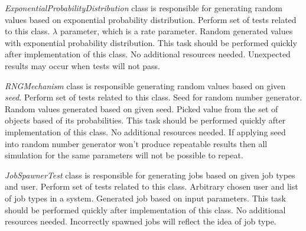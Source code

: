 	{
		{
			\emph{ExponentialProbabilityDistribution} class is responsible for generating random values based on exponential probability distribution.
		}
		{
			Perform set of tests related to this class. 
		}
		{
			$\lambda$ parameter, which is a rate parameter.   
		}
		{
			Random generated values with exponential probability distribution.
		}
		{
			This task should be performed quickly after implementation of this class.
		}
		{
			No additional resources needed.
		}
		{
			Unexpected results may occur when tests will not pass. 
		}
	}
	
	{
		{
			\emph{RNGMechanism} class is responsible generating random values based on given \emph{seed}.
		}
		{
			Perform set of tests related to this class. 
		}
		{
			Seed for random number generator.   
		}
		{
			Random values generated based on given seed. Picked value from the set of objects based of its probabilities.
		}
		{
			This task should be performed quickly after implementation of this class.
		}
		{
			No additional resources needed.
		}
		{
			If applying seed into random number generator won't produce repeatable results then all simulation for the same parameters will not be possible to repeat. 
		}
	}

	{
		{
			\emph{JobSpawnerTest} class is responsible for generating jobs based on given job types and user.
		}
		{
			Perform set of tests related to this class. 
		}
		{
			Arbitrary chosen user and list of job types in a system.   
		}
		{
			Generated job based on input parameters. 
		}
		{
			This task should be performed quickly after implementation of this class.
		}
		{
			No additional resources needed.
		}
		{
			Incorrectly spawned jobs will reflect the idea of job type.
		}
	}

